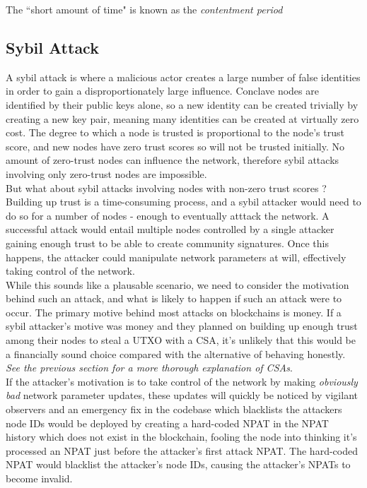 \documentclass{article}
\begin{document}
The ``short amount of time" is known as the \textit{contentment period}



\subsection{Sybil Attack}

A sybil attack is where a malicious actor creates a large number of false identities in order to gain a disproportionately large influence. Conclave nodes are identified by their public keys alone, so  a new identity can be created trivially by creating a new key pair, meaning many identities can be created at virtually zero cost. The degree to which a node is trusted is proportional to the node's trust score, and new nodes have zero trust scores so will not be trusted initially. No amount of zero-trust nodes can influence the network, therefore sybil attacks involving only zero-trust nodes are impossible. \\

But what about sybil attacks involving nodes with non-zero trust scores ? Building up trust is a time-consuming process, and a sybil attacker would need to do so for a number of nodes - enough to eventually atttack the network. A successful attack would entail multiple nodes controlled by a single attacker gaining enough trust to be able to create community signatures. Once this happens, the attacker could manipulate network parameters at will, effectively taking control of the network. \\

While this sounds like a plausable scenario, we need to consider the motivation behind such an attack, and what is likely to happen if such an attack were to occur. The primary motive behind most attacks on blockchains is money. If a sybil attacker's motive was money and they planned on building up enough trust among their nodes to steal a UTXO with a CSA, it's unlikely that this would be a financially sound choice compared with the alternative of behaving honestly. \textit{See the previous section for a more thorough explanation of CSAs}. \\

If the attacker's motivation is to take control of the network by making \textit{obviously bad} network parameter updates, these updates will quickly be noticed by vigilant observers and an emergency fix in the codebase which blacklists the attackers node IDs would be deployed by creating a hard-coded NPAT in the NPAT history which does not exist in the blockchain, fooling the node into thinking it's processed an NPAT just before the attacker's first attack NPAT. The hard-coded NPAT would blacklist the attacker's node IDs, causing the attacker's NPATs to become invalid. \\
\end{document}
